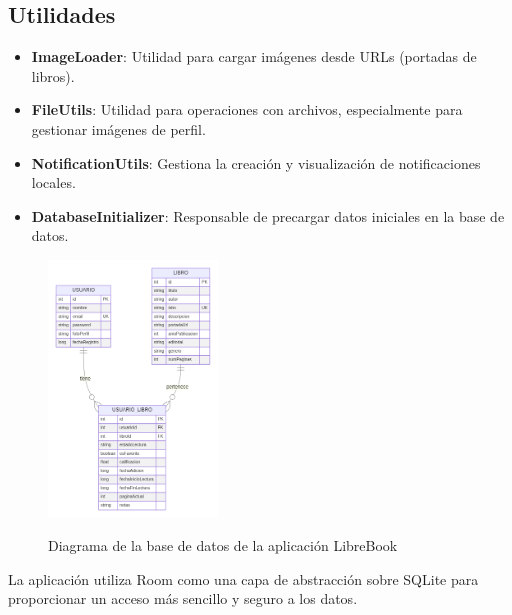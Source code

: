 \documentclass[a4paper,12pt]{report}
\begin{document}
      \subsection{Utilidades}
      \begin{itemize}
        \item \textbf{ImageLoader}: Utilidad para cargar imágenes desde URLs (portadas de libros).
        \item \textbf{FileUtils}: Utilidad para operaciones con archivos, especialmente para gestionar imágenes de perfil.
        \item \textbf{NotificationUtils}: Gestiona la creación y visualización de notificaciones locales.
        \item \textbf{DatabaseInitializer}: Responsable de precargar datos iniciales en la base de datos.
      \end{itemize}
      \begin{figure}[H]
        \centering
        \href{https://raw.githubusercontent.com/Xabierland/DAS-Proyecto/refs/heads/main/Documentation/.img/diagrama-bd.svg}{%
          \includegraphics[width=0.4\textwidth]{.img/diagrama-bd.png}
        }
        \caption{Diagrama de la base de datos de la aplicación LibreBook}
        \label{fig:diagrama-bd}
      \end{figure}
      La aplicación utiliza Room como una capa de abstracción sobre SQLite para proporcionar un acceso más sencillo y seguro a los datos.
\end{document}

